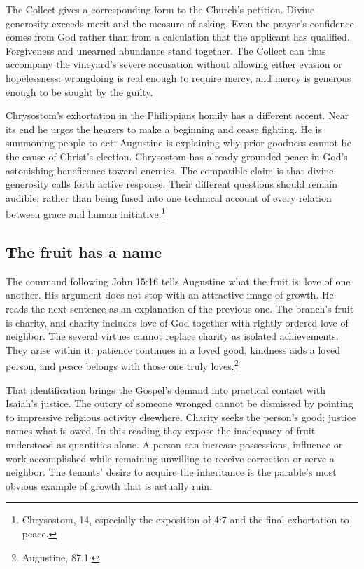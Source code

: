The Collect gives a corresponding form to the Church's petition. Divine generosity exceeds merit and the measure of asking. Even the prayer's confidence comes from God rather than from a calculation that the applicant has qualified. Forgiveness and unearned abundance stand together. The Collect can thus accompany the vineyard's severe accusation without allowing either evasion or hopelessness: wrongdoing is real enough to require mercy, and mercy is generous enough to be sought by the guilty.

Chrysostom's exhortation in the Philippians homily has a different accent. Near its end he urges the hearers to make a beginning and cease fighting. He is summoning people to act; Augustine is explaining why prior goodness cannot be the cause of Christ's election. Chrysostom has already grounded peace in God's astonishing beneficence toward enemies. The compatible claim is that divine generosity calls forth active response. Their different questions should remain audible, rather than being fused into one technical account of every relation between grace and human initiative.\footnote{Chrysostom,  14, especially the exposition of 4:7 and the final exhortation to peace.}

\subsection{The fruit has a name}
The command following John 15:16 tells Augustine what the fruit is: love of one another. His argument does not stop with an attractive image of growth. He reads the next sentence as an explanation of the previous one. The branch's fruit is charity, and charity includes love of God together with rightly ordered love of neighbor. The several virtues cannot replace charity as isolated achievements. They arise within it: patience continues in a loved good, kindness aids a loved person, and peace belongs with those one truly loves.\footnote{Augustine,  87.1.}

That identification brings the Gospel's demand into practical contact with Isaiah's justice. The outcry of someone wronged cannot be dismissed by pointing to impressive religious activity elsewhere. Charity seeks the person's good; justice names what is owed. In this reading they expose the inadequacy of fruit understood as quantities alone. A person can increase possessions, influence or work accomplished while remaining unwilling to receive correction or serve a neighbor. The tenants' desire to acquire the inheritance is the parable's most obvious example of growth that is actually ruin.

